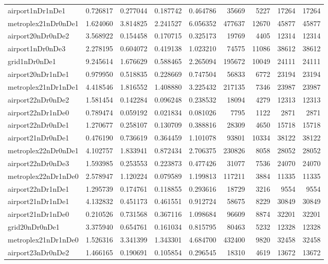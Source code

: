 \begin{longtable}{|l|r|r|r|r|r|r|r|r|}
airport1nDr1nDe1 & 0.726817 & 0.277044 & 0.187742 & 0.464786 & 35669 & 5227 & 17264 & 17264 \\
metroplex21nDr0nDe1 & 1.624060 & 3.814825 & 2.241527 & 6.056352 & 477637 & 12670 & 45877 & 45877 \\
airport20nDr0nDe2 & 3.568922 & 0.154458 & 0.170715 & 0.325173 & 19769 & 4405 & 12314 & 12314 \\
airport1nDr0nDe3 & 2.278195 & 0.604072 & 0.419138 & 1.023210 & 74575 & 11086 & 38612 & 38612 \\
grid1nDr0nDe1 & 9.245614 & 1.676629 & 0.588465 & 2.265094 & 195672 & 10049 & 24111 & 24111 \\
airport20nDr1nDe1 & 0.979950 & 0.518835 & 0.228669 & 0.747504 & 56833 & 6772 & 23194 & 23194 \\
metroplex21nDr1nDe1 & 4.418546 & 1.816552 & 1.408880 & 3.225432 & 217135 & 7346 & 23987 & 23987 \\
airport22nDr0nDe2 & 1.581454 & 0.142284 & 0.096248 & 0.238532 & 18094 & 4279 & 12313 & 12313 \\
airport22nDr1nDe0 & 0.789474 & 0.059192 & 0.021834 & 0.081026 & 7795 & 1122 & 2871 & 2871 \\
airport22nDr0nDe1 & 1.270677 & 0.258107 & 0.130709 & 0.388816 & 28309 & 4650 & 15718 & 15718 \\
airport21nDr0nDe1 & 0.476190 & 0.736619 & 0.364459 & 1.101078 & 93801 & 10334 & 38122 & 38122 \\
metroplex22nDr0nDe1 & 4.102757 & 1.833941 & 0.872434 & 2.706375 & 230826 & 8058 & 28052 & 28052 \\
airport22nDr0nDe3 & 1.593985 & 0.253553 & 0.223873 & 0.477426 & 31077 & 7536 & 24070 & 24070 \\
metroplex22nDr1nDe0 & 2.578947 & 1.120224 & 0.079589 & 1.199813 & 117211 & 3884 & 11335 & 11335 \\
airport22nDr1nDe1 & 1.295739 & 0.174761 & 0.118855 & 0.293616 & 18729 & 3216 & 9554 & 9554 \\
airport21nDr1nDe1 & 4.132832 & 0.451173 & 0.461551 & 0.912724 & 58675 & 8229 & 30849 & 30849 \\
airport21nDr1nDe0 & 0.210526 & 0.731568 & 0.367116 & 1.098684 & 96609 & 8874 & 32201 & 32201 \\
grid20nDr0nDe1 & 3.375940 & 0.654761 & 0.161034 & 0.815795 & 80463 & 5232 & 12328 & 12328 \\
metroplex21nDr1nDe0 & 1.526316 & 3.341399 & 1.343301 & 4.684700 & 432400 & 9820 & 32458 & 32458 \\
airport23nDr0nDe2 & 1.466165 & 0.190691 & 0.105854 & 0.296545 & 18310 & 4619 & 13672 & 13672 \\

\end{longtable}
